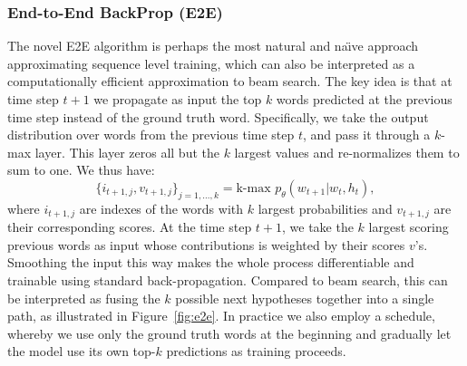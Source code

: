 \subsubsection{End-to-End BackProp (E2E)} 
\label{model-e2e}
The novel E2E algorithm is perhaps the most natural and na\"{\i}ve approach approximating sequence level training, which can also be interpreted as a computationally efficient approximation to beam search. 
The key idea is that at time step $t + 1$ we propagate as input the top $k$ words predicted at the previous time step instead of the ground truth word. 
Specifically, we take the output distribution over words from the previous time step $t$, and pass it through a $k$-max layer. 
This layer zeros all but the $k$ largest values and re-normalizes 
them to sum to one. We thus have: 
\begin{equation}
\{i_{t+1,j}, v_{t+1,j}\}_{j=1, \dots, k} = \mbox{k-max } p_\theta(w_{t+1} |  w_t, h_t), \label{eq:e2e}
\end{equation}
where $i_{t+1,j}$ are indexes of the words with $k$ largest probabilities and $v_{t+1,j}$ are their corresponding scores. 
At the time step $t+1$, we take the $k$ largest scoring previous words as input whose 
contributions is weighted by their scores $v$'s. 
Smoothing the input this way makes the whole process 
differentiable and trainable using standard back-propagation.
Compared to beam search, this can be interpreted as fusing the $k$ possible next 
hypotheses together into a single path, as illustrated in Figure~\ref{fig:e2e}. 
In practice we also employ a schedule, whereby we use only the ground truth words 
at the beginning and gradually let the model use its own top-$k$ predictions as training proceeds. 

